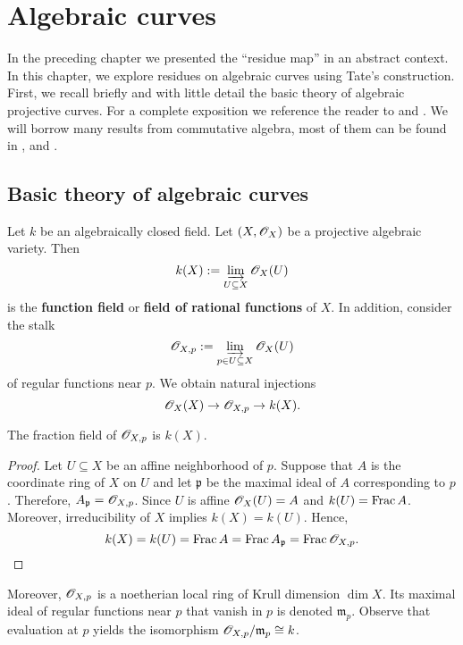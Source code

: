 \chapter{Algebraic curves}\label{ch:algebraic-curves}
In the preceding chapter we presented the ``residue map'' in an abstract context. In this chapter, we explore residues on algebraic curves using Tate's construction. First, we recall briefly and with little detail the basic theory of algebraic projective curves. For a complete exposition we reference the reader to \cite{curves} and \cite{hartshorne}. We will borrow many results from commutative algebra, most of them can be found in \cite{Matsumura}, \cite{comm-alg} and \cite{atiyah}.
\section{Basic theory of algebraic curves}
Let $k$ be an algebraically closed field. Let $(X, {\mathscr O}_{X})$ be a projective algebraic variety. Then 
\[
	k(X) := \varinjlim_{U\subseteq X} {\mathscr O}_{X}(U)
\]
 is the \textbf{function field} or \textbf{field of rational functions} of $X$. In addition, consider the stalk 
\[
	{\mathscr O}_{X,p} := \varinjlim_{p\in U\subseteq X} {\mathscr O}_{X}(U)
\]
of regular functions near $p$. We obtain natural injections 
\[
 	{\mathscr O}_{X}(X) \to {\mathscr O}_{X,p} \to k(X).
\] 
\begin{proposition}\label{prop:fraction-field-local-function-field}
	The fraction field of ${\mathscr O}_{X,p}$ is $k(X)$.
\end{proposition}
\begin{proof}
	Let $U \subseteq X$ be an affine neighborhood of $p$. Suppose that $A$ is the coordinate ring of $X$ on $U$ and let $\mathfrak{p}$ be the maximal ideal of $A$ corresponding to $p$. Therefore, $A_{\mathfrak{p}} = {\mathscr O}_{X,p}$. Since $U$ is affine ${\mathscr O}_{X}(U) = A$ and $k(U) = \operatorname{Frac}{A}$. Moreover, irreducibility of $X$ implies $k(X) = k(U)$. Hence, 
	\[
		k(X) = k(U) = \operatorname{Frac}{A} = \operatorname{Frac}{A_{\mathfrak{p}}} = \operatorname{Frac}{{\mathscr O}_{X,p}}.
	\]
\end{proof}

Moreover, ${\mathscr O}_{X,p}$ is a noetherian local ring of Krull dimension $\dim X$.
Its maximal ideal of regular functions near $p$ that vanish in $p$ is denoted $\mathfrak{m}_{p}$. Observe that evaluation at $p$ yields the isomorphism ${\mathscr O}_{X,p}/\mathfrak{m}_{p} \cong k$.

